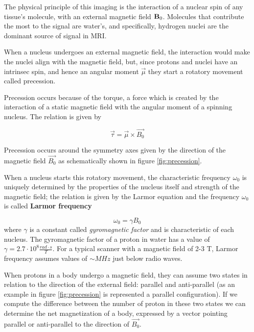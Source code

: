 \documentclass[10pt]{report}
\begin{document}
The physical principle of this imaging is the interaction of a nuclear spin of any tissue's molecule, with an external magnetic field $\textbf B_0$.
Molecules that contribute the most to the signal are water's, and specifically, hydrogen nuclei are the dominant source of signal in MRI.

When a nucleus undergoes an external magnetic field, the interaction would make the nuclei align with the magnetic field, but, since protons and nuclei have an intrinsec spin, and hence an angular moment $\overrightarrow{\mu}$ they start a rotatory movement called precession.

Precession occurs because of the torque, a force which is created by the interaction of a static magnetic field with the angular moment of a spinning nucleus.
The relation is given by

\begin{equation}
\overrightarrow{\tau} = \overrightarrow{\mu} \times \overrightarrow{B_0}
\end{equation}

Precession occurs around the symmetry axes given by the direction of the magnetic field $\overrightarrow{B_0}$ as schematically shown in figure \ref{fig:precession}.

When a nucleus starts this rotatory movement, the characteristic frequency $\omega_0$ is uniquely determined by the properties of the nucleus itself and strength of the magnetic field; the relation is given by the Larmor equation and the frequency $\omega_0$ is called \textbf{Larmor frequency}

\[
\omega_0 = \gamma B_0
\]
where  $\gamma$ is a constant called \emph{gyromagnetic factor} and is characteristic of each nucleus.
The gyromagnetic factor of a proton in water has a value of $\gamma = 2.7\cdot 10^8 \frac{rad\cdot s}{T}$.
For a typical scanner with a magnetic field of 2-3 T, Larmor frequency assumes values of $\sim MHz$ just below radio waves.

When protons in a body undergo a magnetic field, they can assume two states in relation to the direction of the external field: parallel and anti-parallel (as an example in figure \ref{fig:precession} is represented a parallel configuration).
If we compute the difference between the number of proton in these two states we can determine the net magnetization of a body, expressed by a vector pointing parallel or anti-parallel to the direction of $\overrightarrow{B_0}$.
\end{document}
